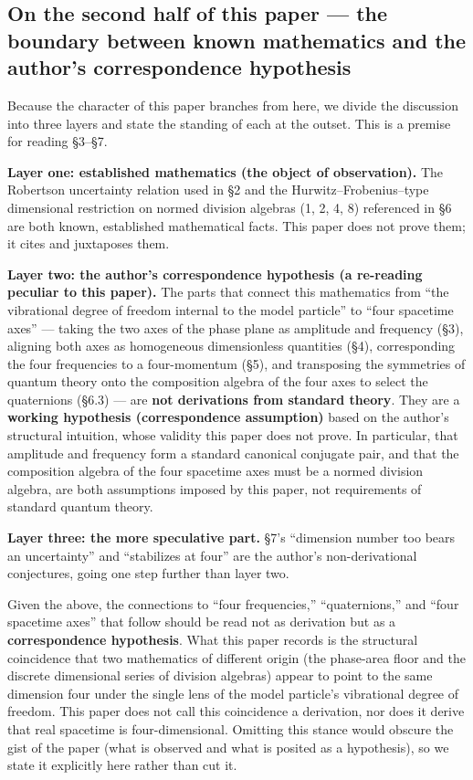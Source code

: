\documentclass[
]{article}
\begin{document}
\subsection{On the second half of this paper --- the boundary between
known mathematics and the author's correspondence
hypothesis}\label{on-the-second-half-of-this-paper-the-boundary-between-known-mathematics-and-the-authors-correspondence-hypothesis}

Because the character of this paper branches from here, we divide the
discussion into three layers and state the standing of each at the
outset. This is a premise for reading §3--§7.

\textbf{Layer one: established mathematics (the object of observation).}
The Robertson uncertainty relation used in §2 and the
Hurwitz--Frobenius--type dimensional restriction on normed division
algebras (1, 2, 4, 8) referenced in §6 are both known, established
mathematical facts. This paper does not prove them; it cites and
juxtaposes them.

\textbf{Layer two: the author's correspondence hypothesis (a re-reading
peculiar to this paper).} The parts that connect this mathematics from
``the vibrational degree of freedom internal to the model particle'' to
``four spacetime axes'' --- taking the two axes of the phase plane as
amplitude and frequency (§3), aligning both axes as homogeneous
dimensionless quantities (§4), corresponding the four frequencies to a
four-momentum (§5), and transposing the symmetries of quantum theory
onto the composition algebra of the four axes to select the quaternions
(§6.3) --- are \textbf{not derivations from standard theory}. They are a
\textbf{working hypothesis (correspondence assumption)} based on the
author's structural intuition, whose validity this paper does not prove.
In particular, that amplitude and frequency form a standard canonical
conjugate pair, and that the composition algebra of the four spacetime
axes must be a normed division algebra, are both assumptions imposed by
this paper, not requirements of standard quantum theory.

\textbf{Layer three: the more speculative part.} §7's ``dimension number
too bears an uncertainty'' and ``stabilizes at four'' are the author's
non-derivational conjectures, going one step further than layer two.

Given the above, the connections to ``four frequencies,''
``quaternions,'' and ``four spacetime axes'' that follow should be read
not as derivation but as a \textbf{correspondence hypothesis}. What this
paper records is the structural coincidence that two mathematics of
different origin (the phase-area floor and the discrete dimensional
series of division algebras) appear to point to the same dimension four
under the single lens of the model particle's vibrational degree of
freedom. This paper does not call this coincidence a derivation, nor
does it derive that real spacetime is four-dimensional. Omitting this
stance would obscure the gist of the paper (what is observed and what is
posited as a hypothesis), so we state it explicitly here rather than cut
it.
\end{document}
